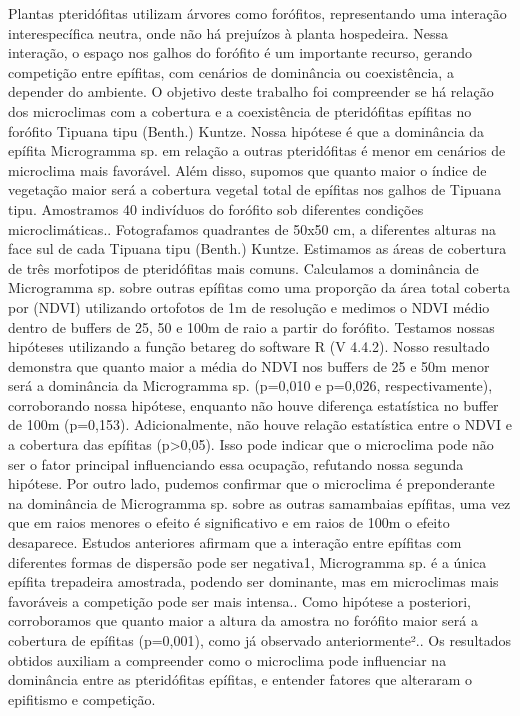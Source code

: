 \documentclass[
]{book}
\begin{document}
Plantas pteridófitas utilizam árvores como forófitos, representando uma interação interespecífica neutra, onde não há prejuízos à planta hospedeira. Nessa interação, o espaço nos galhos do forófito é um importante recurso, gerando competição entre epífitas, com cenários de dominância ou coexistência, a depender do ambiente. O objetivo deste trabalho foi compreender se há relação dos microclimas com a cobertura e a coexistência de pteridófitas epífitas no forófito Tipuana tipu (Benth.) Kuntze. Nossa hipótese é que a dominância da epífita Microgramma sp. em relação a outras pteridófitas é menor em cenários de microclima mais favorável. Além disso, supomos que quanto maior o índice de vegetação maior será a cobertura vegetal total de epífitas nos galhos de Tipuana tipu. Amostramos 40 indivíduos do forófito sob diferentes condições microclimáticas.. Fotografamos quadrantes de 50x50 cm, a diferentes alturas na face sul de cada Tipuana tipu (Benth.) Kuntze. Estimamos as áreas de cobertura de três morfotipos de pteridófitas mais comuns. Calculamos a dominância de Microgramma sp. sobre outras epífitas como uma proporção da área total coberta por (NDVI) utilizando ortofotos de 1m de resolução e medimos o NDVI médio dentro de buffers de 25, 50 e 100m de raio a partir do forófito. Testamos nossas hipóteses utilizando a função betareg do software R (V 4.4.2). Nosso resultado demonstra que quanto maior a média do NDVI nos buffers de 25 e 50m menor será a dominância da Microgramma sp. (p=0,010 e p=0,026, respectivamente), corroborando nossa hipótese, enquanto não houve diferença estatística no buffer de 100m (p=0,153). Adicionalmente, não houve relação estatística entre o NDVI e a cobertura das epífitas (p\textgreater0,05). Isso pode indicar que o microclima pode não ser o fator principal influenciando essa ocupação, refutando nossa segunda hipótese. Por outro lado, pudemos confirmar que o microclima é preponderante na dominância de Microgramma sp. sobre as outras samambaias epífitas, uma vez que em raios menores o efeito é significativo e em raios de 100m o efeito desaparece. Estudos anteriores afirmam que a interação entre epífitas com diferentes formas de dispersão pode ser negativa1, Microgramma sp. é a única epífita trepadeira amostrada, podendo ser dominante, mas em microclimas mais favoráveis a competição pode ser mais intensa.. Como hipótese a posteriori, corroboramos que quanto maior a altura da amostra no forófito maior será a cobertura de epífitas (p=0,001), como já observado anteriormente².. Os resultados obtidos auxiliam a compreender como o microclima pode influenciar na dominância entre as pteridófitas epífitas, e entender fatores que alteraram o epifitismo e competição.
\end{document}
